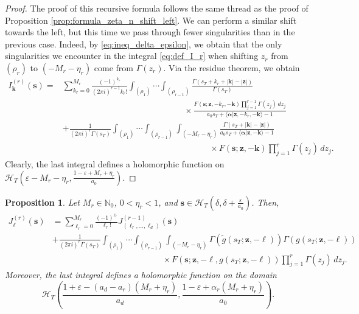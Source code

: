 \documentclass[a4paper,12pt]{article}
\newtheorem{prop}[thm]{Proposition}
\theoremstyle{definition}
\numberwithin{equation}{section}
\newcommand{\dd}{d}
\newcommand{\ii}{i}
\begin{document}
\begin{proof}
The proof of this recursive formula follows the same thread as the proof of Proposition \ref{prop:formula_zeta_n_shift_left}. We can perform a similar shift towards the left, but this time we pass through fewer singularities than in the previous case. Indeed, by \eqref{eq:ineq_delta_epsilon}, we obtain that the only singularities we encounter in the integral \eqref{eq:def_I_r} when shifting $z_r$ from $(\rho_r)$ to $(-M_r-\eta_r)$ come from $\Gamma(z_r)$. Via the residue theorem, we obtain
\begin{align*}
    I^{(r)}_{\mathbf{k}}(\mathbf{s}) =& \sum_{k_r=0}^{M_r}\frac{(-1)^{k_r}}{(2\pi \ii)^{r-1} k_r!} \int_{(\rho_1)} \cdots \int_{(\rho_{r-1})} \frac{\Gamma(s_T+k_r+|\mathbf{k}|-|\mathbf{z}|)}{\Gamma(s_T)} \\
    & \hspace{171pt} \times \frac{F(\mathbf{s};\mathbf{z},-k_r,-\mathbf{k})\prod_{j=1}^{r-1} \Gamma(z_j) \, \dd z_{j}}{a_0s_T+\langle \boldsymbol{\alpha}|\mathbf{z},-k_r,-\mathbf{k} \rangle-1} \\
    & + \frac{1}{(2\pi \ii)^r\Gamma(s_T)} \int_{(\rho_{1})} \cdots \int_{(\rho_{r-1})}\int_{(-M_r-\eta_r)} \frac{\Gamma(s_T+|\mathbf{k}|-|\mathbf{z}|)}{a_0s_T+\langle \boldsymbol{\alpha}|\mathbf{z},-\mathbf{k} \rangle -1} \\
    & \hspace{207pt} \times F(\mathbf{s};\mathbf{z},-\mathbf{k})\prod_{j=1}^r \Gamma(z_j) \, \dd z_j.
\end{align*}
Clearly, the last integral defines a holomorphic function on $\mathcal{H}_T(\varepsilon-M_r-\eta_r,\frac{1-\varepsilon+M_r+\eta_r}{a_0})$.
\end{proof}

\begin{prop}
\label{prop:iterative_structure_J_r}
Let $M_r \in \mathbb{N}_0$, $0<\eta_r<1$, and $\mathbf{s} \in \mathcal{H}_T(\delta,\delta+\frac{\varepsilon}{a_0})$. Then,
\begin{align*}
    J^{(r)}_{\boldsymbol{\ell}}(\mathbf{s})&=\sum_{\ell_r=0}^{M_r} \frac{(-1)^{\ell_r}}{\ell_r!} J^{(r-1)}_{(\ell_r,\ldots,\ell_d)}(\mathbf{s}) \\
    & + \frac{1}{(2\pi \ii)^r \Gamma(s_T)} \int_{(\rho_1)} \cdots \int_{(\rho_{r-1})}\int_{(-M_{r}-\eta_{r})} \Gamma(\widetilde{g}(s_T;\mathbf{z},-\boldsymbol{\ell}))\Gamma(g(s_T;\mathbf{z},-\boldsymbol{\ell})) \\
    & \hspace{155pt} \times F(\mathbf{s};\mathbf{z},-\boldsymbol{\ell},g(s_T;\mathbf{z},-\boldsymbol{\ell})) \prod_{j=1}^r \Gamma(z_j) \, \dd z_j.
\end{align*}
Moreover, the last integral defines a holomorphic function on the domain
$$ \mathcal{H}_T\left(\frac{1+\varepsilon-(a_d-a_r)(M_r+\eta_r)}{a_d},\frac{1-\varepsilon+\alpha_r(M_r+\eta_r)}{a_0}\right). $$
\end{prop}
\end{document}
